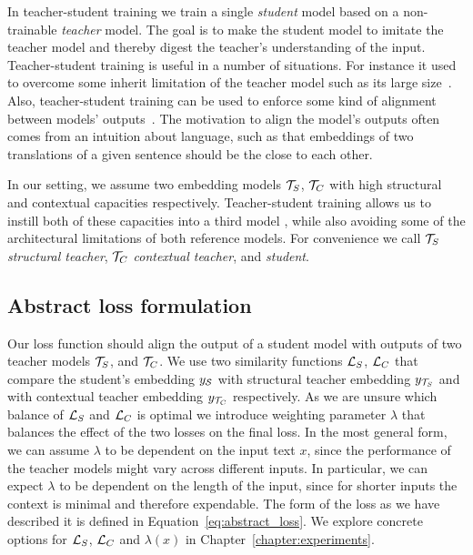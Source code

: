 In teacher-student training we train a single \emph{student} model based on a
non-trainable \emph{teacher} model. The goal is to make the student model to
imitate the teacher model and thereby digest the teacher's understanding of the
input. Teacher-student training is useful in a number of situations. For
instance it used to overcome some inherit limitation of the teacher model such
as its large size~\citep{sanh2019distilbert}. Also, teacher-student training
can be used to enforce some kind of alignment between models'
outputs~\citep{reimers2020making}. The motivation to align the model's outputs
often comes from an intuition about language, such as that embeddings of
two translations of a given sentence should be the close to each other.

In our setting, we assume two embedding models $\mathcal{T}_S$, $\mathcal{T}_C$ with
high structural and contextual capacities respectively. Teacher-student
training allows us to instill both of these capacities into a third model
{\Student}, while also avoiding some of the architectural limitations of both
reference models. For convenience we call $\mathcal{T}_S$ \emph{structural
teacher}, $\mathcal{T}_C$ \emph{contextual teacher}, and {\Student}
\emph{student}.


\subsection{Abstract loss formulation}\label{section:abstract_loss}


Our loss function should align the output of a student model {\Student} with
outputs of two teacher models $\mathcal{T}_S$, and $\mathcal{T}_C$. We use two
similarity functions $\mathcal{L}_S$, $\mathcal{L}_C$ that compare the student's embedding
$y_{\mathcal{S}}$ with structural teacher embedding $y_{\mathcal{T}_S}$ and with
contextual teacher embedding $y_{\mathcal{T}_C}$ respectively. As we are unsure
which balance of $\mathcal{L}_S$ and $\mathcal{L}_C$ is optimal we introduce weighting
parameter $\lambda$ that balances the effect of the two losses on the final
loss. In the most general form, we can assume $\lambda$ to be dependent on the
input text $x$, since the performance of the teacher models might vary across
different inputs. In particular, we can expect $\lambda$ to be dependent on the
length of the input, since for shorter inputs the context is minimal and
therefore expendable. The form of the loss as we have described it is defined
in Equation~\ref{eq:abstract_loss}. We explore concrete options for $\mathcal{L}_S$,
$\mathcal{L}_C$ and $\lambda(x)$ in Chapter~\ref{chapter:experiments}.

